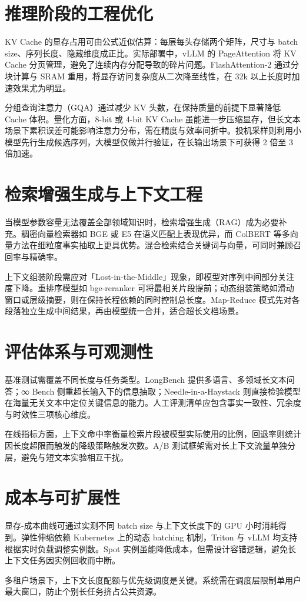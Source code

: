 \chapter{推理阶段的工程优化}
KV Cache 的显存占用可由公式近似估算：每层每头存储两个矩阵，尺寸与 batch size、序列长度、隐藏维度成正比。实际部署中，vLLM 的 PageAttention 将 KV Cache 分页管理，避免了连续内存分配导致的碎片问题。FlashAttention-2 通过分块计算与 SRAM 重用，将显存访问复杂度从二次降至线性，在 32k 以上长度时加速效果尤为明显。\par
分组查询注意力（GQA）通过减少 KV 头数，在保持质量的前提下显著降低 Cache 体积。量化方面，8-bit 或 4-bit KV Cache 虽能进一步压缩显存，但长文本场景下累积误差可能影响注意力分布，需在精度与效率间折中。投机采样则利用小模型先行生成候选序列，大模型仅做并行验证，在长输出场景下可获得 2 倍至 3 倍加速。\par
\chapter{检索增强生成与上下文工程}
当模型参数容量无法覆盖全部领域知识时，检索增强生成（RAG）成为必要补充。稠密向量检索器如 BGE 或 E5 在语义匹配上表现优异，而 ColBERT 等多向量方法在细粒度事实抽取上更具优势。混合检索结合关键词与向量，可同时兼顾召回率与精确率。\par
上下文组装阶段需应对「Lost-in-the-Middle」现象，即模型对序列中间部分关注度下降。重排序模型如 bge-reranker 可将最相关片段提前；动态组装策略如滑动窗口或层级摘要，则在保持长程依赖的同时控制总长度。Map-Reduce 模式先对各段落独立生成中间结果，再由模型统一合并，适合超长文档场景。\par
\chapter{评估体系与可观测性}
基准测试需覆盖不同长度与任务类型。LongBench 提供多语言、多领域长文本问答；∞ Bench 侧重超长输入下的信息抽取；Needle-in-a-Haystack 则直接检验模型在海量无关文本中定位关键信息的能力。人工评测清单应包含事实一致性、冗余度与时效性三项核心维度。\par
在线指标方面，上下文命中率衡量检索片段被模型实际使用的比例，回退率则统计因长度超限而触发的降级策略触发次数。A/B 测试框架需对长上下文流量单独分层，避免与短文本实验相互干扰。\par
\chapter{成本与可扩展性}
显存-成本曲线可通过实测不同 batch size 与上下文长度下的 GPU 小时消耗得到。弹性伸缩依赖 Kubernetes 上的动态 batching 机制，Triton 与 vLLM 均支持根据实时负载调整实例数。Spot 实例虽能降低成本，但需设计容错逻辑，避免长上下文任务因实例回收而中断。\par
多租户场景下，上下文长度配额与优先级调度是关键。系统需在调度层限制单用户最大窗口，防止个别长任务挤占公共资源。\par
